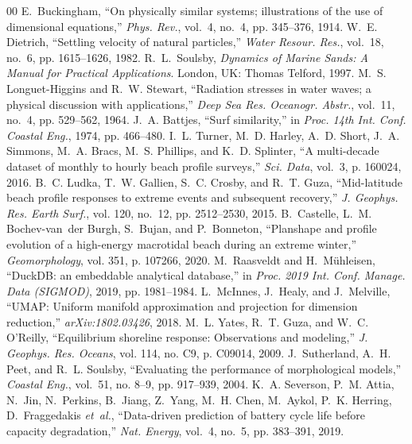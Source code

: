 \documentclass[journal]{IEEEtran}
\begin{document}
\begin{thebibliography}{00}
 E.~Buckingham, ``On physically similar systems; illustrations of the use of dimensional equations,'' \textit{Phys. Rev.}, vol.~4, no.~4, pp. 345--376, 1914.
 W.~E. Dietrich, ``Settling velocity of natural particles,'' \textit{Water Resour. Res.}, vol.~18, no.~6, pp. 1615--1626, 1982.
 R.~L.~Soulsby, \textit{Dynamics of Marine Sands: A Manual for Practical Applications}. London, UK: Thomas Telford, 1997.
 M.~S. Longuet-Higgins and R.~W. Stewart, ``Radiation stresses in water waves; a physical discussion with applications,'' \textit{Deep Sea Res. Oceanogr. Abstr.}, vol.~11, no.~4, pp. 529--562, 1964.
 J.~A. Battjes, ``Surf similarity,'' in \textit{Proc. 14th Int. Conf. Coastal Eng.}, 1974, pp. 466--480.
 I.~L. Turner, M.~D. Harley, A.~D. Short, J.~A. Simmons, M.~A. Bracs, M.~S. Phillips, and K.~D. Splinter, ``A multi-decade dataset of monthly to hourly beach profile surveys,'' \textit{Sci. Data}, vol.~3, p. 160024, 2016.
 B.~C. Ludka, T.~W. Gallien, S.~C. Crosby, and R.~T. Guza, ``Mid-latitude beach profile responses to extreme events and subsequent recovery,'' \textit{J. Geophys. Res. Earth Surf.}, vol. 120, no.~12, pp. 2512--2530, 2015.
 B.~Castelle, L.~M. Bochev-van~der Burgh, S.~Bujan, and P.~Bonneton, ``Planshape and profile evolution of a high-energy macrotidal beach during an extreme winter,'' \textit{Geomorphology}, vol. 351, p. 107266, 2020.
 M.~Raasveldt and H.~M{\"u}hleisen, ``DuckDB: an embeddable analytical database,'' in \textit{Proc. 2019 Int. Conf. Manage. Data (SIGMOD)}, 2019, pp. 1981--1984.
 L.~McInnes, J.~Healy, and J.~Melville, ``UMAP: Uniform manifold approximation and projection for dimension reduction,'' \textit{arXiv:1802.03426}, 2018.
 M.~L. Yates, R.~T. Guza, and W.~C. O'Reilly, ``Equilibrium shoreline response: Observations and modeling,'' \textit{J. Geophys. Res. Oceans}, vol. 114, no. C9, p. C09014, 2009.
 J.~Sutherland, A.~H. Peet, and R.~L. Soulsby, ``Evaluating the performance of morphological models,'' \textit{Coastal Eng.}, vol.~51, no. 8--9, pp. 917--939, 2004.
 K.~A. Severson, P.~M. Attia, N.~Jin, N.~Perkins, B.~Jiang, Z.~Yang, M.~H. Chen, M.~Aykol, P.~K. Herring, D.~Fraggedakis \textit{et~al.}, ``Data-driven prediction of battery cycle life before capacity degradation,'' \textit{Nat. Energy}, vol.~4, no.~5, pp. 383--391, 2019.

\end{thebibliography}
\end{document}
